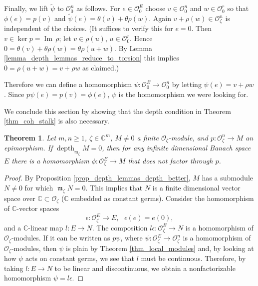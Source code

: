 \documentclass{amsart}
\numberwithin{equation}{section}
\theoremstyle{definition}
\theoremstyle{plain}
\newtheorem{theorem}[definition]{Theorem}
\theoremstyle{remark}
\begin{document}
Finally, we lift $\tilde{\psi}$ to ${\ensuremath{\mathcal{{O}}}}^n_0$ as follows.
For $e\in{\ensuremath{\mathcal{{O}}}}^E_0$ choose $v\in{\ensuremath{\mathcal{{O}}}}^n_0$ and $w\in{\ensuremath{\mathcal{{O}}}}^r_0$
so that
$\phi(e)=p(v)$ and $\tilde{\psi}(e)=\theta(v)+\theta\rho(w)$.
Again $v+\rho(w)\in{\ensuremath{\mathcal{{O}}}}^n_\zeta$ is independent of the choices.
(It suffices to verify this for $e=0$. Then $v\in\ker p={{\mathop{\mathrm{Im\,}}}}\rho$; let $v\in\rho(u)$, $u\in{\ensuremath{\mathcal{{O}}}}^r_0$.
Hence $0=\theta(v)+\theta\rho(w)=\theta\rho(u+w)$. By Lemma \ref{lemma_depth_lemmas_reduce_to_torsion}
this implies $0=\rho(u+w)=v+\rho w$ as claimed.)

Therefore we can define a homomorphism $\psi:{\ensuremath{\mathcal{{O}}}}^E_0\rightarrow{\ensuremath{\mathcal{{O}}}}^n_0$
by letting $\psi(e)=v+\rho w$. Since $p\psi(e)=p(v)=\phi(e)$,
$\psi$ is the homomorphism we were looking for.

We conclude this section by showing that the depth condition in Theorem 
\ref{thm_coh_stalk} is also necessary.

\begin{theorem}\label{thm_necessary}
Let $m,n\geq 1$, $\zeta\in\mathbb{C}^m$, $M\not=0$ a finite
${\ensuremath{\mathcal{{O}}}}_\zeta$-module, and $p:{\ensuremath{\mathcal{{O}}}}^n_\zeta\rightarrow M$ an
epimorphism. If ${\mathop{\mathrm{depth}}\nolimits _{{{{\mathop{\mathfrak{m}}}}_\zeta}}} M=0$, then for any 
infinite dimensional Banach space $E$ there is a homomorphism $\phi:{\ensuremath{\mathcal{{O}}}}^E_\zeta\rightarrow M$ that does not factor through $p$.
\end{theorem}
\begin{proof}
By Proposition \ref{prop_depth_lemmas_depth_better}, $M$ has a submodule 
$N\not=0$ for which ${{\mathop{\mathfrak{m}}}}_\zeta N=0$. This implies that $N$ is a finite dimensional vector space over $\mathbb{C}\subset{\ensuremath{\mathcal{{O}}}}_\zeta$ ($\mathbb{C}$
embedded as constant germs).
Consider the homomorphism of $\mathbb{C}$-vector spaces 
\[
	\epsilon:{\ensuremath{\mathcal{{O}}}}_\zeta^E\rightarrow E,
	\text{ } \epsilon(e)=e(0),
\]
and a $\mathbb{C}$-linear map $l:E\rightarrow N$. The composition 
$l\epsilon:{\ensuremath{\mathcal{{O}}}}^E_\zeta\rightarrow N$ is a homomorphism of ${\ensuremath{\mathcal{{O}}}}_\zeta$-modules.
If it can be written as $p\psi$, where  $\psi:{\ensuremath{\mathcal{{O}}}}^E_\zeta\rightarrow{\ensuremath{\mathcal{{O}}}}_\zeta^n$
is a homomorphism of${\ensuremath{\mathcal{{O}}}}_\zeta$-modules, then $\psi$ is plain by Theorem
\ref{thm_local_modules} and, by looking at how $\psi$ acts on constant germs,
we see that $l$ must be continuous. Therefore, by taking $l:E\rightarrow N$
to be linear and discontinuous, we obtain a nonfactorizable homomorphism $\psi=l\epsilon$.
\end{proof}
\end{document}
